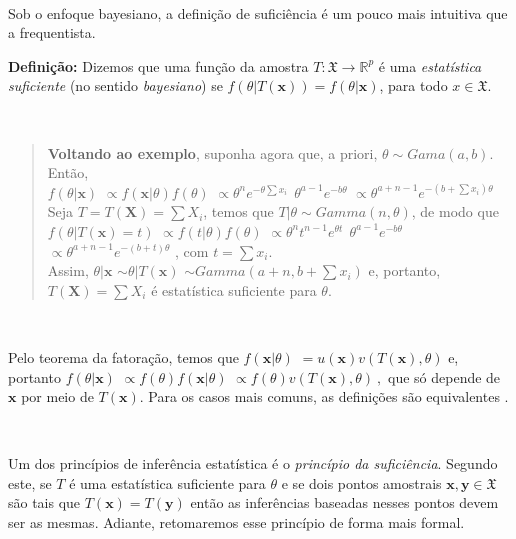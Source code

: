 \documentclass[
]{book}
\begin{document}
\(~\)

Sob o enfoque bayesiano, a definição de suficiência é um pouco mais intuitiva que a frequentista.

\textbf{Definição:} Dizemos que uma função da amostra \(T:\mathfrak{X} \rightarrow \mathbb{R}^p\) é uma \emph{estatística suficiente} (no sentido \emph{bayesiano}) se \(f\left(\theta | T(\boldsymbol x)\right) = f\left(\theta | \boldsymbol x\right)\), para todo \(x \in \mathfrak{X}\).

\(~\)

\begin{quote}
\textbf{Voltando ao exemplo}, suponha agora que, a priori, \(\theta \sim Gama(a,b)\). Então,\\
\(f(\theta| \boldsymbol x)\) \(\propto f(\boldsymbol x|\theta)f(\theta)\) \(\propto \theta^n e^{-\theta \sum x_i} ~~\theta^{a-1}e^{-b\theta}\) \(\propto \theta^{a+n-1} e^{-(b+\sum x_i)\theta}\)\\
Seja \(T = T(\boldsymbol X) = \sum X_i\), temos que \(T|\theta\sim Gamma(n,\theta)\), de modo que\\
\(f\left(\theta| T(\boldsymbol x)=t\right)\) \(\propto f(t|\theta)f(\theta)\) \(\propto \theta^n t^{n-1} e^{\theta t} ~~\theta^{a-1}e^{-b\theta}\) \(\propto \theta^{a+n-1} e^{-(b+t)\theta}\) , com \(t=\sum x_i\).\\
Assim, \(\theta|\boldsymbol x\) \(\sim \theta|T(\boldsymbol x)\) \(\sim Gamma\left(a+n,b+\sum x_i\right)\) e, portanto, \(T(\boldsymbol X) = \sum X_i\) é estatística suficiente para \(\theta\).
\end{quote}

\(~\)

Pelo teorema da fatoração, temos que \(f\left(\boldsymbol x | \theta\right)\) \(= u(\boldsymbol x) v\left(T(\boldsymbol x),\theta\right)\) e, portanto \(f(\theta|\boldsymbol x)\) \(\propto f(\theta) f\left(\boldsymbol x | \theta\right)\) \(\propto f(\theta) v\left(T(\boldsymbol x),\theta\right)~,\) que só depende de \(\boldsymbol x\) por meio de \(T(\boldsymbol x)\). Para os casos mais comuns, as definições são equivalentes \citep{Schervish12}.

\(~\)

Um dos princípios de inferência estatística é o \emph{princípio da suficiência}. Segundo este, se \(T\) é uma estatística suficiente para \(\theta\) e se dois pontos amostrais \(\boldsymbol x, \boldsymbol y \in \mathfrak{X}\) são tais que \(T(\boldsymbol x)=T(\boldsymbol y)\) então as inferências baseadas nesses pontos devem ser as mesmas. Adiante, retomaremos esse princípio de forma mais formal.
\end{document}
